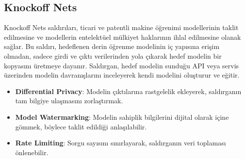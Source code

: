 \newpage

\subsection{Knockoff Nets}

Knockoff Nets saldırıları, ticari ve patentli makine öğrenimi modellerinin taklit edilmesine ve modellerin entelektüel mülkiyet haklarının ihlal edilmesine olanak sağlar. Bu saldırı, hedeflenen derin öğrenme modelinin iç yapısına erişim olmadan, sadece girdi ve çıktı verilerinden yola çıkarak hedef modelin bir kopyasını üretmeye dayanır. Saldırgan, hedef modelin sunduğu API veya servis üzerinden modelin davranışlarını inceleyerek kendi modelini oluşturur ve eğitir.

\begin{itemize}
    \item \textbf{Differential Privacy}: Modelin çıktılarına rastgelelik ekleyerek, saldırganın tam bilgiye ulaşmasını zorlaştırmak.
    \item \textbf{Model Watermarking}: Modelin sahiplik bilgilerini dijital olarak içine gömmek, böylece taklit edildiği anlaşılabilir.
    \item \textbf{Rate Limiting}: Sorgu sayısını sınırlayarak, saldırganın veri toplaması önlenebilir.
\end{itemize}

\newpage